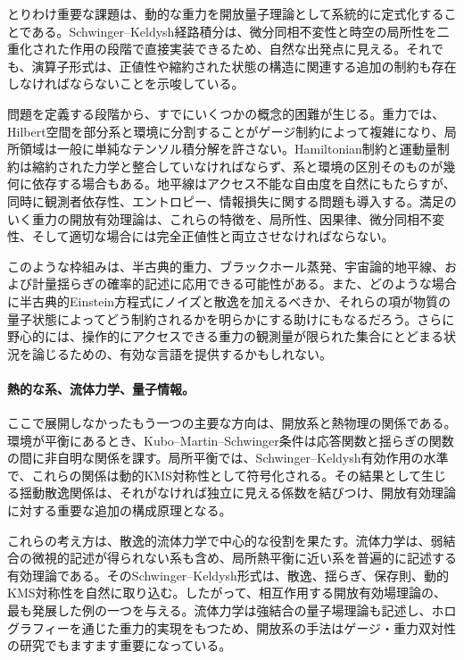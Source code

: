 \documentclass[a4paper,11pt,oneside]{article}
\theoremstyle{definition}
\numberwithin{equation}{section}
\begin{document}
とりわけ重要な課題は、動的な重力を開放量子理論として系統的に定式化することである。Schwinger--Keldysh経路積分は、微分同相不変性と時空の局所性を二重化された作用の段階で直接実装できるため、自然な出発点に見える。それでも、演算子形式は、正値性や縮約された状態の構造に関連する追加の制約も存在しなければならないことを示唆している。



問題を定義する段階から、すでにいくつかの概念的困難が生じる。重力では、Hilbert空間を部分系と環境に分割することがゲージ制約によって複雑になり、局所領域は一般に単純なテンソル積分解を許さない。Hamiltonian制約と運動量制約は縮約された力学と整合していなければならず、系と環境の区別そのものが幾何に依存する場合もある。地平線はアクセス不能な自由度を自然にもたらすが、同時に観測者依存性、エントロピー、情報損失に関する問題も導入する。満足のいく重力の開放有効理論は、これらの特徴を、局所性、因果律、微分同相不変性、そして適切な場合には完全正値性と両立させなければならない。



このような枠組みは、半古典的重力、ブラックホール蒸発、宇宙論的地平線、および計量揺らぎの確率的記述に応用できる可能性がある。また、どのような場合に半古典的Einstein方程式にノイズと散逸を加えるべきか、それらの項が物質の量子状態によってどう制約されるかを明らかにする助けにもなるだろう。さらに野心的には、操作的にアクセスできる重力の観測量が限られた集合にとどまる状況を論じるための、有効な言語を提供するかもしれない。



\paragraph{熱的な系、流体力学、量子情報。}



ここで展開しなかったもう一つの主要な方向は、開放系と熱物理の関係である。環境が平衡にあるとき、Kubo--Martin--Schwinger条件は応答関数と揺らぎの関数の間に非自明な関係を課す。局所平衡では、Schwinger--Keldysh有効作用の水準で、これらの関係は動的KMS対称性として符号化される。その結果として生じる揺動散逸関係は、それがなければ独立に見える係数を結びつけ、開放有効理論に対する重要な追加の構成原理となる。



これらの考え方は、散逸的流体力学で中心的な役割を果たす。流体力学は、弱結合の微視的記述が得られない系も含め、局所熱平衡に近い系を普遍的に記述する有効理論である。そのSchwinger--Keldysh形式は、散逸、揺らぎ、保存則、動的KMS対称性を自然に取り込む。したがって、相互作用する開放有効場理論の、最も発展した例の一つを与える。流体力学は強結合の量子場理論も記述し、ホログラフィーを通じた重力的実現をもつため、開放系の手法はゲージ・重力双対性の研究でもますます重要になっている。
\end{document}
